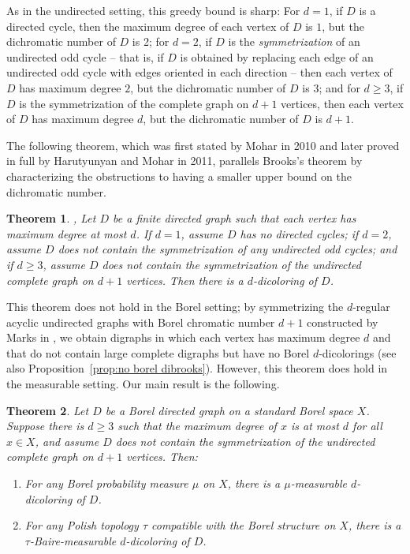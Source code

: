 \documentclass[psamsfonts]{amsart}
\newtheorem{thm}{Theorem}[section]
\theoremstyle{definition}
\theoremstyle{remark}
\numberwithin{equation}{section}
\begin{document}
As in the undirected setting, this greedy bound is sharp: For $d = 1$, if $D$ is a directed cycle, then the maximum degree of each vertex of $D$ is $1$, but the dichromatic number of $D$ is 2; for $d = 2$, if $D$ is the {\it symmetrization} of an undirected odd cycle -- that is, if $D$ is obtained by replacing each edge of an undirected odd cycle with edges oriented in each direction -- then each vertex of $D$ has maximum degree $2$, but the dichromatic number of $D$ is $3$; and for $d \geq 3$, if $D$ is the symmetrization of the complete graph on $d + 1$ vertices, then each vertex of $D$ has maximum degree $d$, but the dichromatic number of $D$ is $d + 1$. 

The following theorem, which was first stated by Mohar in 2010 and later proved in full by Harutyunyan and Mohar in 2011, parallels Brooks's theorem by characterizing the obstructions to having a smaller upper bound on the dichromatic number.

\begin{thm}
    \cite[Theorem~2.3]{mohar2010}, \cite{hm2011} Let $D$ be a finite directed graph such that each vertex has maximum degree at most $d$. If $d = 1$, assume $D$ has no directed cycles; if $d = 2$, assume $D$ does not contain the symmetrization of any undirected odd cycles; and if $d \geq 3$, assume $D$ does not contain the symmetrization of the undirected complete graph on $d + 1$ vertices. Then there is a $d$-dicoloring of $D$.
\end{thm}

This theorem does not hold in the Borel setting; by symmetrizing the $d$-regular acyclic undirected graphs with Borel chromatic number $d + 1$ constructed by Marks in \cite{marks2016}, we obtain digraphs in which each vertex has maximum degree $d$ and that do not contain large complete digraphs but have no Borel $d$-dicolorings (see also Proposition~\ref{prop:no borel dibrooks}). However, this theorem does hold in the measurable setting. Our main result is the following.

\begin{thm}
\label{thm:dibrooks}
    Let $D$ be a Borel directed graph on a standard Borel space $X$. Suppose there is $d \geq 3$ such that the maximum degree of $x$ is at most $d$ for all $x \in X$, and assume $D$ does not contain the symmetrization of the undirected complete graph on $d + 1$ vertices. Then:
    \begin{enumerate}
        \item For any Borel probability measure $\mu$ on $X$, there is a $\mu$-measurable $d$-dicoloring of $D$.
        \item For any Polish topology $\tau$ compatible with the Borel structure on $X$, there is a $\tau$-Baire-measurable $d$-dicoloring of $D$.
    \end{enumerate}
\end{thm}
\end{document}
